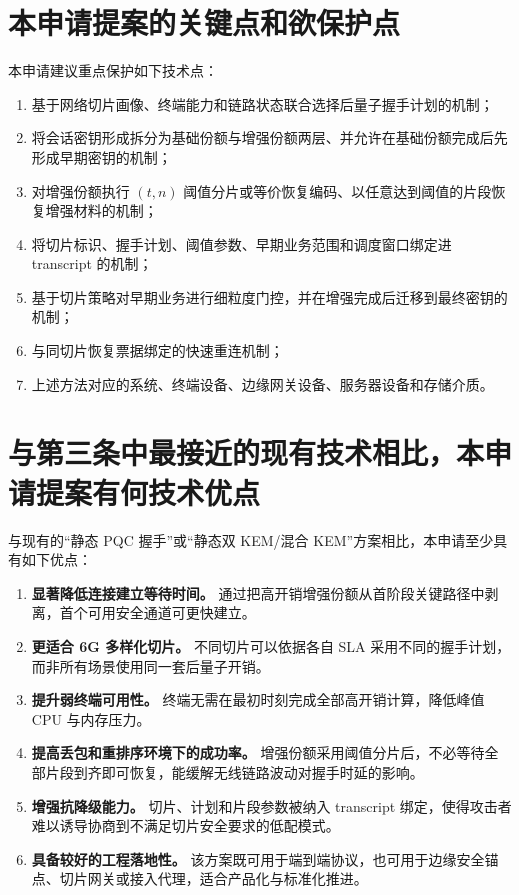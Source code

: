 \documentclass[12pt,a4paper]{article}
\begin{document}
\section{本申请提案的关键点和欲保护点}

本申请建议重点保护如下技术点：

\begin{enumerate}[leftmargin=2em]
    \item 基于网络切片画像、终端能力和链路状态联合选择后量子握手计划的机制；
    \item 将会话密钥形成拆分为基础份额与增强份额两层、并允许在基础份额完成后先形成早期密钥的机制；
    \item 对增强份额执行 $(t,n)$ 阈值分片或等价恢复编码、以任意达到阈值的片段恢复增强材料的机制；
    \item 将切片标识、握手计划、阈值参数、早期业务范围和调度窗口绑定进 transcript 的机制；
    \item 基于切片策略对早期业务进行细粒度门控，并在增强完成后迁移到最终密钥的机制；
    \item 与同切片恢复票据绑定的快速重连机制；
    \item 上述方法对应的系统、终端设备、边缘网关设备、服务器设备和存储介质。
\end{enumerate}

\section{与第三条中最接近的现有技术相比，本申请提案有何技术优点}

与现有的“静态 PQC 握手”或“静态双 KEM/混合 KEM”方案相比，本申请至少具有如下优点：

\begin{enumerate}[leftmargin=2em]
    \item \textbf{显著降低连接建立等待时间。} 通过把高开销增强份额从首阶段关键路径中剥离，首个可用安全通道可更快建立。
    \item \textbf{更适合 6G 多样化切片。} 不同切片可以依据各自 SLA 采用不同的握手计划，而非所有场景使用同一套后量子开销。
    \item \textbf{提升弱终端可用性。} 终端无需在最初时刻完成全部高开销计算，降低峰值 CPU 与内存压力。
    \item \textbf{提高丢包和重排序环境下的成功率。} 增强份额采用阈值分片后，不必等待全部片段到齐即可恢复，能缓解无线链路波动对握手时延的影响。
    \item \textbf{增强抗降级能力。} 切片、计划和片段参数被纳入 transcript 绑定，使得攻击者难以诱导协商到不满足切片安全要求的低配模式。
    \item \textbf{具备较好的工程落地性。} 该方案既可用于端到端协议，也可用于边缘安全锚点、切片网关或接入代理，适合产品化与标准化推进。
\end{enumerate}
\end{document}
